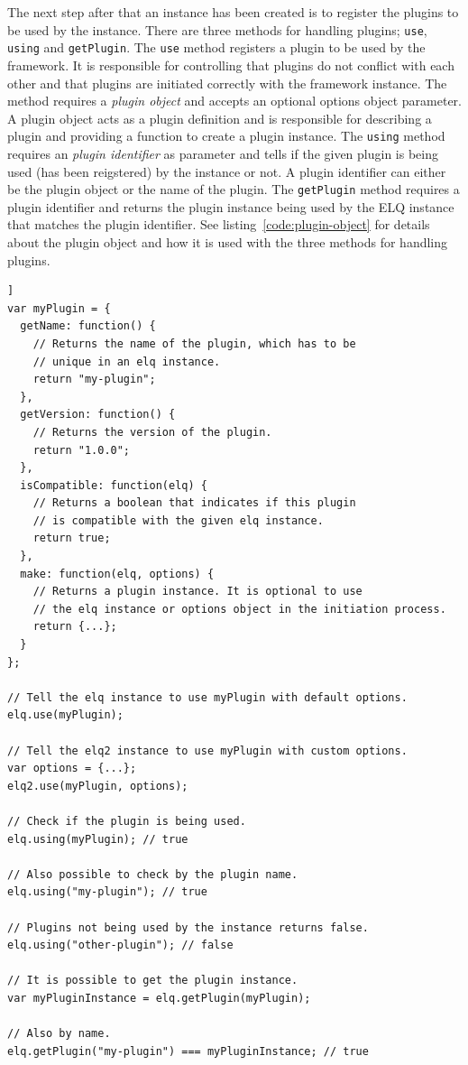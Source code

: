 \documentclass[a4paper,11pt]{kth-mag}
\newcommand{\code}[1]{\texttt{#1}}
\newcommand\abbr[2][]{\uppercase{#2}\ifthenelse{\equal{#1}{}}%
                     {}{#1}}
\begin{document}
          The next step after that an instance has been created is to register the plugins to be used by the instance.
          There are three methods for handling plugins; \code{use}, \code{using} and \code{getPlugin}.
          The \code{use} method registers a plugin to be used by the framework.
          It is responsible for controlling that plugins do not conflict with each other and that plugins are initiated correctly with the framework instance.
          The method requires a \emph{plugin object} and accepts an optional options object parameter.
          A plugin object acts as a plugin definition and is responsible for describing a plugin and providing a function to create a plugin instance.
          The \code{using} method requires an \emph{plugin identifier} as parameter and tells if the given plugin is being used (has been reigstered) by the instance or not.
          A plugin identifier can either be the plugin object or the name of the plugin.
          The \code{getPlugin} method requires a plugin identifier and returns the plugin instance being used by the \abbr{elq} instance that matches the plugin identifier.
          See listing~\ref{code:plugin-object} for details about the plugin object and how it is used with the three methods for handling plugins.

          \begin{lstlisting}[caption={Plugin object definition and examples of handling plugins.},captionpos=b,label={code:plugin-object}]]
var myPlugin = {
  getName: function() {
    // Returns the name of the plugin, which has to be 
    // unique in an elq instance.
    return "my-plugin";
  },
  getVersion: function() {
    // Returns the version of the plugin.
    return "1.0.0";
  },
  isCompatible: function(elq) {
    // Returns a boolean that indicates if this plugin
    // is compatible with the given elq instance.
    return true;
  },
  make: function(elq, options) {
    // Returns a plugin instance. It is optional to use
    // the elq instance or options object in the initiation process.
    return {...};
  }
};

// Tell the elq instance to use myPlugin with default options.
elq.use(myPlugin);

// Tell the elq2 instance to use myPlugin with custom options.
var options = {...};
elq2.use(myPlugin, options);

// Check if the plugin is being used.
elq.using(myPlugin); // true

// Also possible to check by the plugin name.
elq.using("my-plugin"); // true

// Plugins not being used by the instance returns false.
elq.using("other-plugin"); // false

// It is possible to get the plugin instance.
var myPluginInstance = elq.getPlugin(myPlugin);

// Also by name.
elq.getPlugin("my-plugin") === myPluginInstance; // true
          \end{lstlisting}
\end{document}
